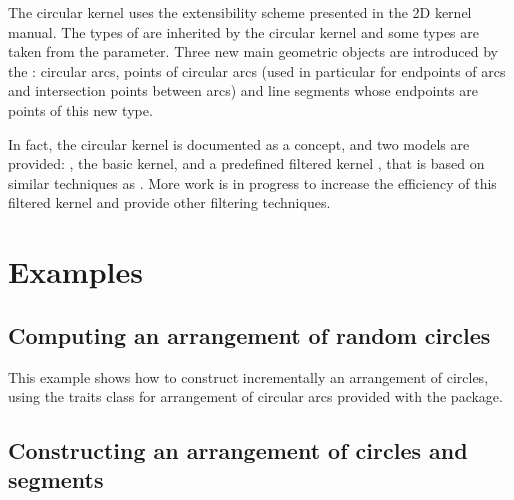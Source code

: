 The circular kernel uses the extensibility scheme presented in the 2D
kernel manual. The types of  are inherited
by the circular kernel and some types are taken from the
 parameter. Three new main geometric objects are
introduced by the : circular arcs, points of
circular arcs (used in particular for endpoints of arcs and
intersection points between arcs) and line segments whose endpoints
are points of this new type.  

In fact, the circular kernel is documented as a concept, and two
models are provided: , the basic kernel, and
a predefined filtered kernel , 
that is based on similar techniques as 
. 
More work is in progress to increase the efficiency of this filtered kernel
and provide other filtering techniques. 

\section{Examples}

	\subsection{Computing an arrangement of random circles} 

This example shows how to construct incrementally an arrangement of
circles, using the traits class for arrangement of circular arcs
provided with the package.


	\subsection{Constructing an arrangement of circles and segments} 

